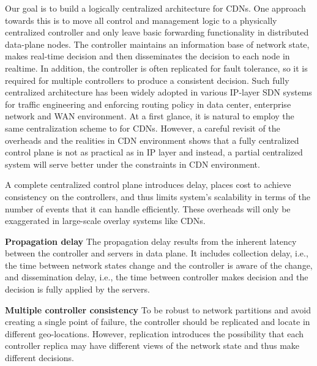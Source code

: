 Our goal is to build a logically centralized architecture for CDNs. One approach towards this is to move all control and management logic to a physically centralized controller and only leave basic forwarding functionality in distributed data-plane nodes. The controller maintains an information base of network state, makes real-time decision and then disseminates the decision to each node in realtime. In addition, the controller is often replicated for fault tolerance, so it is required for multiple controllers to produce a consistent decision.
Such fully centralized architecture has been widely adopted in various IP-layer SDN systems for traffic engineering and enforcing routing policy in data center, enterprise network and WAN environment.
At a first glance, it is natural to employ the same centralization scheme to for CDNs. However, a careful revisit of the overheads and the realities in CDN environment shows that a fully centralized control plane is not as practical as in IP layer and instead, a partial centralized system will serve better under the constraints in CDN environment. 

A complete centralized control plane introduces delay, places cost to achieve consistency on the controllers, and thus limits system's scalability in terms of the number of events that it can handle efficiently. These overheads will only be exaggerated in large-scale overlay systems like CDNs. 

\begin{packeditemize}
	\item {\bf Propagation delay} The propagation delay results from the inherent latency between the controller and servers in data plane. It includes collection delay, i.e., the time between network states change and the controller is aware of the change, and dissemination delay, i.e., the time between controller makes decision and the decision is fully applied by the servers. 
	\item {\bf Multiple controller consistency} To be robust to network partitions and avoid creating a single point of failure, the controller should be replicated and locate in different geo-locations. However, replication introduces the possibility that each controller replica may have different views of the network state and thus make different decisions. 
\end{packeditemize}

